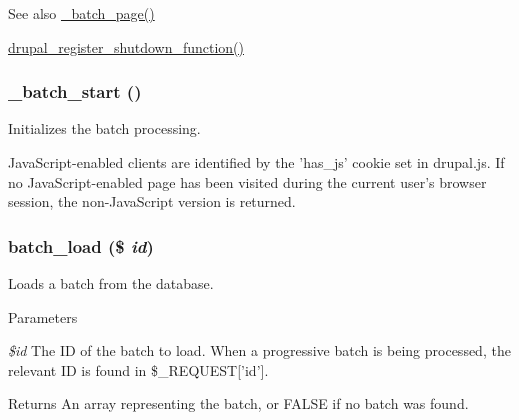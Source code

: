 \begin{DoxySeeAlso}{See also}
\hyperlink{batch_8inc_a5535c7cfeae572bda2c11f3e597a55b6}{\_\-batch\_\-page()} 

\hyperlink{group__php__wrappers_gac7eaf11b49995f7f539f5c830a65b34f}{drupal\_\-register\_\-shutdown\_\-function()} 
\end{DoxySeeAlso}
\hypertarget{batch_8inc_a1d38b90eeddc5da76b02e87fb6158ed1}{
\subsubsection[{\_\-batch\_\-start}]{\setlength{\rightskip}{0pt plus 5cm}\_\-batch\_\-start ()}}
\label{batch_8inc_a1d38b90eeddc5da76b02e87fb6158ed1}
Initializes the batch processing.

JavaScript-\/enabled clients are identified by the 'has\_\-js' cookie set in drupal.js. If no JavaScript-\/enabled page has been visited during the current user's browser session, the non-\/JavaScript version is returned. \hypertarget{batch_8inc_a43cd9cb0044756355a8e3c68356fbb16}{
\subsubsection[{batch\_\-load}]{\setlength{\rightskip}{0pt plus 5cm}batch\_\-load (\$ {\em id})}}
\label{batch_8inc_a43cd9cb0044756355a8e3c68356fbb16}
Loads a batch from the database.


\begin{DoxyParams}{Parameters}
\item[{\em \$id}]The ID of the batch to load. When a progressive batch is being processed, the relevant ID is found in \$\_\-REQUEST\mbox{[}'id'\mbox{]}.\end{DoxyParams}
\begin{DoxyReturn}{Returns}
An array representing the batch, or FALSE if no batch was found. 
\end{DoxyReturn}
